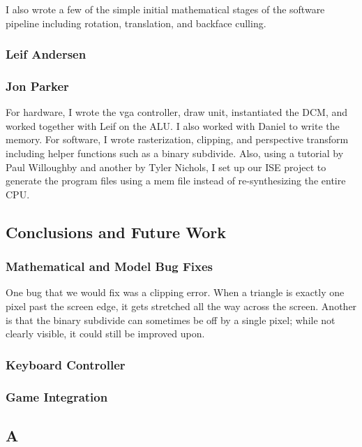 \documentclass[onecolumn]{IEEEtran}
\begin{document}
I also wrote a few of the simple initial mathematical stages of the software pipeline including rotation, translation, and backface culling.

\subsection{Leif Andersen}

\subsection{Jon Parker}
For hardware, I wrote the vga controller, draw unit, instantiated the DCM, and worked together with Leif on the ALU.  I also worked with Daniel to write the memory.  For software, I wrote rasterization, clipping, and perspective transform including helper functions such as a binary subdivide.  Also, using a tutorial by Paul Willoughby and another by Tyler Nichols, I set up our ISE project to generate the program files using a mem file instead of re-synthesizing the entire CPU.


\section{Conclusions and Future Work}
\subsection{Mathematical and Model Bug Fixes}
One bug that we would fix was a clipping error. When a triangle is exactly one pixel past the screen edge, it gets stretched all the way across the screen.  Another is that the binary subdivide can sometimes be off by a single pixel; while not clearly visible, it could still be improved upon.

\subsection{Keyboard Controller}

\subsection{Game Integration}




\appendix
\begin{center}
\chapter{A}
\end{center}

%

\end{document}
